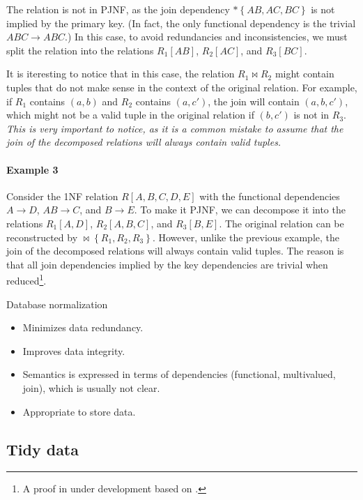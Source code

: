 The relation is not in PJNF, as the join dependency $* \left\{ AB, AC, BC \right\}$ is not
implied by the primary key.  (In fact, the only functional dependency is the trivial $ABC
\to ABC$.)  In this case, to avoid redundancies and inconsistencies, we must split the
relation into the relations $R_1[AB]$, $R_2[AC]$, and $R_3[BC]$.

It is iteresting to notice that in this case, the relation $R_1 \bowtie R_2$ might
contain tuples that do not make sense in the context of the original relation.  For
example, if $R_1$ contains $(a, b)$ and $R_2$ contains $(a, c')$, the join will contain
$(a, b, c')$, which might not be a valid tuple in the original relation if $(b, c')$ is
not in $R_3$.  \emph{This is very important to notice, as it is a common mistake to assume
that the join of the decomposed relations will always contain valid tuples.}

\paragraph{Example 3}  Consider the 1NF relation $R[A, B, C, D, E]$ with the functional
dependencies $A \to D$, $AB \to C$, and $B \to E$.  To make it PJNF, we can decompose it
into the relations $R_1[A, D]$, $R_2[A, B, C]$, and $R_3[B, E]$.  The original relation can
be reconstructed by $\bowtie \left\{ R_1, R_2, R_3 \right\}$.  However, unlike the
previous example, the join of the decomposed relations will always contain valid tuples.
The reason is that all join dependencies implied by the key dependencies are trivial when
reduced\footnote{\color{red}A proof in under development based on .}.

\begin{slidebox}{Database normalization}{}
  \begin{itemize}
    \item Minimizes data redundancy.
    \item Improves data integrity.
    \item Semantics is expressed in terms of dependencies (functional, multivalued, join),
      which is usually not clear.
    \item Appropriate to store data.
  \end{itemize}
\end{slidebox}

\subsection{Tidy data}

